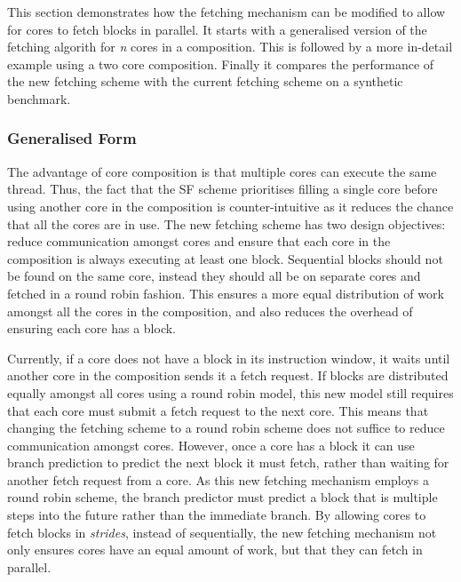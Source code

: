 This section demonstrates how the fetching mechanism can be modified to allow for cores to fetch blocks in parallel.
It starts with a generalised version of the fetching algorith for \textit{n} cores in a composition.
This is followed by a more in-detail example using a two core composition.
Finally it compares the performance of the new fetching scheme with the current fetching scheme on a synthetic benchmark.

\subsubsection{Generalised Form}


The advantage of core composition is that multiple cores can execute the same thread.
Thus, the fact that the SF scheme prioritises filling a single core before using another core in the composition is counter-intuitive as it reduces the chance that all the cores are in use.
The new fetching scheme has two design objectives: reduce communication amongst cores and ensure that each core in the composition is always executing at least one block.
Sequential blocks should not be found on the same core, instead they should all be on separate cores and fetched in a round robin fashion.
This ensures a more equal distribution of work amongst all the cores in the composition, and also reduces the overhead of ensuring each core has a block.

Currently, if a core does not have a block in its instruction window, it waits until another core in the composition sends it a fetch request.
If blocks are distributed equally amongst all cores using a round robin model, this new model still requires that each core must submit a fetch request to the next core.
This means that changing the fetching scheme to a round robin scheme does not suffice to reduce communication amongst cores.
However, once a core has a block it can use branch prediction to predict the next block it must fetch, rather than waiting for another fetch request from a core.
As this new fetching mechanism employs a round robin scheme, the branch predictor must predict a block that is multiple steps into the future rather than the immediate branch.
By allowing cores to fetch blocks in \textit{strides}, instead of sequentially, the new fetching mechanism not only ensures cores have an equal amount of work, but that they can fetch in parallel.

